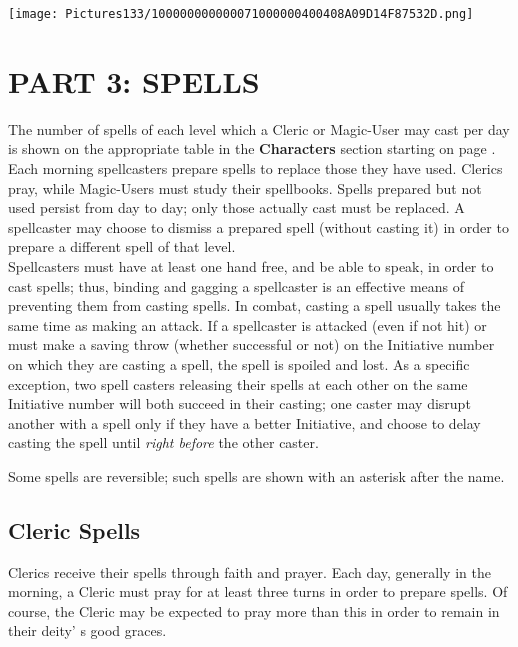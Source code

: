 \documentclass[a4paper,twoside,openany,10pt]{book}
\begin{document}
\vfill

\texttt{[image: Pictures133/100000000000071000000400408A09D14F87532D.png]}

\pagebreak

\section{PART 3: SPELLS}\label{part-3-spells}

\begin{multicols}{2}
	
The number of spells of each level which a Cleric or Magic-User may cast
per day is shown on the appropriate table in the \textbf{Characters} section starting on page \hyperlink{part-2-player-characters}{\pageref{part-2-player-characters}}. Each morning spellcasters prepare spells to replace those they have used. Clerics pray, while Magic-Users must study their spellbooks. Spells prepared but not used persist from day to day; only those actually cast must be replaced. A spellcaster may choose to dismiss a prepared spell (without casting it) in order to prepare a different spell of that level.\\

Spellcasters must have at least one hand free, and be able to speak, in order to cast spells; thus, binding and gagging a spellcaster is an effective means of preventing them from casting spells. In combat, casting a spell usually takes the same time as making an attack. If a spellcaster is attacked (even if not hit) or must make a saving throw (whether successful or not) on the Initiative number on which they are casting a spell, the spell is spoiled and lost. As a specific exception, two spell casters releasing their spells at each other on the same Initiative number will both succeed in their casting; one caster may disrupt another with a spell only if they have a better Initiative, and choose to delay casting the spell until \emph{right before} the other caster.

Some spells are reversible; such spells are shown with an asterisk after the name.

\subsection{Cleric Spells}\label{cleric-spells}

Clerics receive their spells through faith and prayer. Each day, generally in the morning, a Cleric must pray for at least three turns in order to prepare spells. Of course, the Cleric may be expected to pray more than this in order to remain in their deity' s good graces.


\end{multicols}
\end{document}
